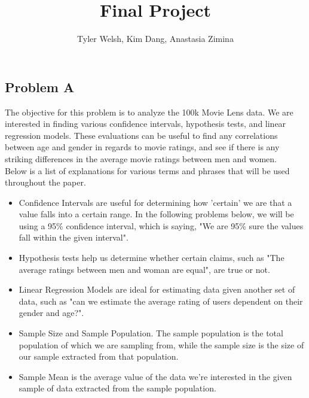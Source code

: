 \documentclass[11pt]{article}  %
\title{\textbf{Final Project}}
\author{Tyler Welsh, Kim Dang, Anastasia Zimina}
\date{}
\begin{document}

\maketitle
\tableofcontents

\newpage
\begin{center}
\section*{Problem A}
\end{center}

\indent The objective for this problem is to analyze the 100k Movie Lens data. We are interested in finding various confidence intervals, hypothesis tests, and linear regression models. These evaluations can be useful to find any correlations between age and gender in regards to movie ratings, and see if there is any striking differences in the average movie ratings between men and women.\\
\indent Below is a list of explanations for various terms and phrases that will be used throughout the paper.
\begin{itemize}
    \item Confidence Intervals are useful for determining how 'certain' we are that a value falls into a certain range. In the following problems below, we will be using a 95\% confidence interval, which is saying, "We are 95\% sure the values fall within the given interval".
    
    \item Hypothesis tests help us determine whether certain claims, such as "The average ratings between men and woman are equal", are true or not.
    
    \item Linear Regression Models are ideal for estimating data given another set of data, such as "can we estimate the average rating of users dependent on their gender and age?".
    \item Sample Size and Sample Population. The sample population is the total population of which we are sampling from, while the sample size is the size of our sample extracted from that population. 
    
    \item Sample Mean is the average value of the data we're interested in the given sample of data extracted from the sample population.
    
\end{itemize}
\end{document}
